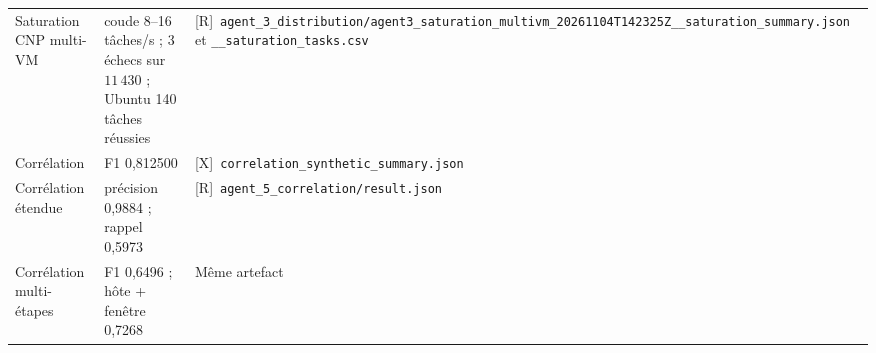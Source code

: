 \begin{longtable}{p{} p{} p{}}
Saturation CNP multi-VM & coude 8--16 tâches/s ; 3 échecs sur $11\,430$ ; Ubuntu 140 tâches réussies & [R]~\texttt{agent\_3\_distribution/agent3\_saturation\_multivm\_20261104T142325Z\_\_saturation\_summary.json} et \texttt{\_\_saturation\_tasks.csv} \\
Corrélation & F1 0,812500 & [X]~\texttt{correlation\_synthetic\_summary.json} \\
Corrélation étendue & précision 0,9884 ; rappel 0,5973 & [R]~\texttt{agent\_5\_correlation/result.json} \\
Corrélation multi-étapes & F1 0,6496 ; hôte + fenêtre 0,7268 & Même artefact \\
\bottomrule
\end{longtable}
